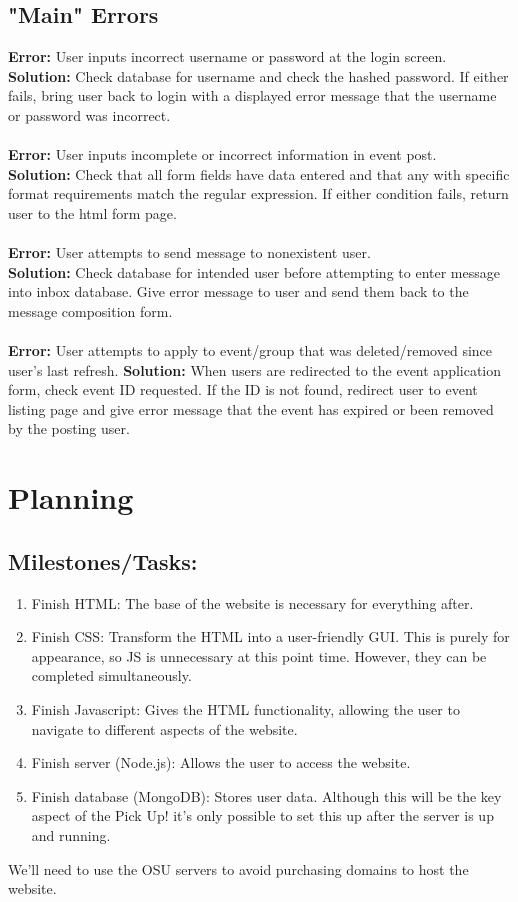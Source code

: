 \documentclass[a4paper]{article}
\begin{document}
\subsection{"Main" Errors}

\textbf{Error:}
User inputs incorrect username or password at the login screen.\\
\textbf{Solution:}
Check database for username and check the hashed password. If either fails, bring user back to login with a displayed error message that the username or password was incorrect.\\
\\
\textbf{Error:}
User inputs incomplete or incorrect information in event post.\\
\textbf{Solution:}
Check that all form fields have data entered and that any with specific format requirements match the regular expression. If either condition fails, return user to the html form page.\\
\\
\textbf{Error:}
User attempts to send message to nonexistent user.\\
\textbf{Solution:}
Check database for intended user before attempting to enter message into inbox database. Give error message to user and send them back to the message composition form.\\
\\
\textbf{Error:}
User attempts to apply to event/group that was deleted/removed since user's last refresh.
\textbf{Solution:}
When users are redirected to the event application form, check event ID requested. If the ID is not found, redirect user to event listing page and give error message that the event has expired or been removed by the posting user.

\section{Planning}
\subsection{Milestones/Tasks:}
\begin{enumerate}
\item Finish HTML: The base of the website is necessary for everything after.
\item Finish CSS: Transform the HTML into a user-friendly GUI. This is purely for appearance, so JS is unnecessary at this point time. However, they can be completed simultaneously.
\item Finish Javascript: Gives the HTML functionality, allowing the user to navigate to different aspects of the website.
\item Finish server (Node.js): Allows the user to access the website.
\item Finish database (MongoDB): Stores user data. Although this will be the key aspect of the Pick Up! it's only possible to set this up after the server is up and running.
\end{enumerate}
We'll need to use the OSU servers to avoid purchasing domains to host the website.
\newpage
\end{document}
